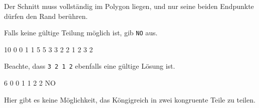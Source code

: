 \documentclass{boi2014-de}
\newcommand{\constant}[1]{{\tt #1}}
\begin{document}
    Der Schnitt muss vollständig im Polygon liegen, und nur seine beiden Endpunkte dürfen den Rand berühren.

    Falls keine gültige Teilung möglich ist, gib \constant{NO} aus.

    \clearpage

    \Examples
	\example
	{
		10  0  0  1  1  5  5  3  3  2  2
	}
	{
		1 2 3 2
	}
	{
        Beachte, dass {\tt 3 2 1 2} ebenfalls eine gültige Lösung ist.

        \begin{center}
        \end{center}
    }

    \example
    {
        6  0  0  1  1  2  2
    }
    {
        NO
    }
    {
        Hier gibt es keine Möglichkeit, das Köngigreich in zwei kongruente Teile zu teilen.
        \begin{center}
        \end{center}
    }

    \Scoring
\end{document}

